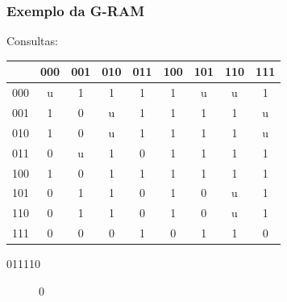 \documentclass{beamer}
\begin{document}
\begin{frame}
    \frametitle{Exemplo da G-RAM}
    Consultas:

    \begin{table}
        \centering
        \begin{tabular}{|c|c|c|c|c|c|c|c|c|}
            \hline
                &       000 &       001 &       010 &       011 &       100 &       101 &       110 &       111\\
            \hline
            000 &        u  &        1  &        1  &        1  &        1  &        u  &        u  &        1 \\
            \hline
            001 &        1  &        0  &        u  &        1  &        1  &        1  &        1  &        u \\
            \hline
            010 &        1  &        0  &        u  &        1  &        1  &        1  &        1  &        u \\
            \hline
            011 &        0  &        u  &        1  &        0  &        1  &        1  &        1  &        1 \\
            \hline
            100 &        1  &        0  &        1  &        1  &        1  &        1  &        1  &        1 \\
            \hline
            101 &        0  &        1  &        1  &        0  &        1  &        0  &        u  &        1 \\
            \hline
            110 &        0  &        1  &        1  & \alert 0  &        1  &        0  &        u  &        1 \\
            \hline
            111 &        0  &        0  &        0  &        1  &        0  &        1  &        1  &        0 \\
            \hline

        \end{tabular}
    \end{table}
    \begin{description}
        \item[011110] 0
    \end{description}
\end{frame}
\end{document}
